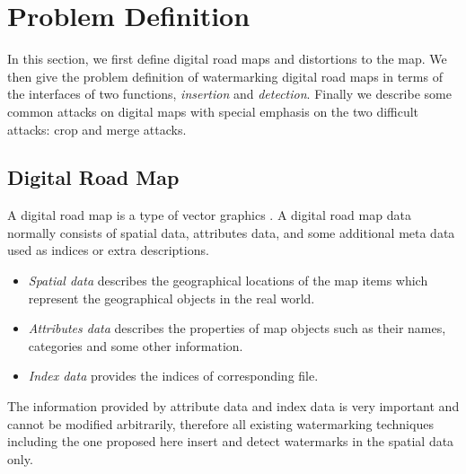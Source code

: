 \section{Problem Definition}
\label{sec:problem}
In this section, we first define digital road maps and distortions
to the map. We then give the problem definition of watermarking digital road maps
in terms of the interfaces of two functions, {\em insertion} and {\em detection}. 
Finally we describe some common attacks on digital maps with special emphasis 
on the two difficult attacks: crop and merge attacks. 


\subsection{Digital Road Map}
A digital road map is a type of vector graphics \cite{Niu06:Survey}.
A digital road map data normally consists of spatial data, 
attributes data, and some additional meta data used as indices or 
extra descriptions. 
\begin{itemize}
\item {\em Spatial data} describes the geographical locations of the map items which represent 
the geographical objects in the real world. 

\item {\em Attributes data} describes the properties of map objects such as their names, categories
and some other information.
\item {\em Index data} provides the indices of corresponding file.
\end{itemize}

The information provided by attribute data and index data is very important 
and cannot be modified arbitrarily, therefore all existing watermarking
techniques including the one proposed here insert and detect watermarks in
the spatial data only.

